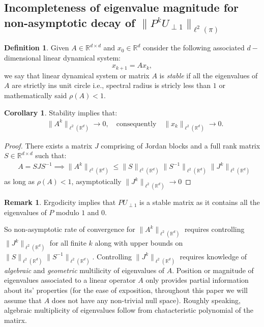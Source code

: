 \documentclass[preprint]{imsart}
\theoremstyle{plain}
\theoremstyle{definition}
\newtheorem{definition}[theorem]{Definition}
\newtheorem{remark}{Remark}
\newtheorem{corollary}{Corollary}
\begin{document}
\subsection{Incompleteness of eigenvalue magnitude for non-asymptotic decay of $\|P^{k}U_{\perp 1}\|_{\ell^{2}(\pi)}$}
\begin{definition}
Given $A \in \mathbb{R}^{d \times d}$ and $x_{0} \in \mathbb{R}^{d}$ consider the following associated $d-$ dimensional linear dynamical system:
\[
x_{k+1}=Ax_{k},
\]
we say that linear dynamical system or matrix $A$ is \emph{stable}  if all the eigenvalues of $A$ are strictly ins unit circle i.e., spectral radius is stricly less than $1$ or mathematically said $\rho(A)<1$.     
\end{definition}
\begin{corollary}
    Stability implies that:
    \begin{align}
        & \nonumber \|A^{k}\|_{\ell^{2}(\mathbb{R}^{d})}\rightarrow 0, \quad \text{consequently}  \quad   \|x_{k}\|_{\ell^{2}(\mathbb{R}^{d})} \rightarrow 0.      
    \end{align}
\end{corollary}
\begin{proof}
    There exists a matrix $J$ comprising of Jordan blocks and a full rank matrix $S \in \mathbb{R}^{d \times d}$ such that: 
     \begin{align}
         & \nonumber A=SJS^{-1} \implies \|A^{k}\|_{\ell^{2}(\mathbb{R}^{d})} \leq \|S\|_{\ell^{2}(\mathbb{R}^{d})}\|S^{-1}\|_{\ell^{2}(\mathbb{R}^{d})}\|J^{k}\|_{\ell^{2}(\mathbb{R}^{d})}          
     \end{align}
     as long as $\rho(A)<1$, asymptotically $\|J^{k}\|_{\ell^{2}(\mathbb{R}^{d})}\rightarrow 0$
\end{proof}
\begin{remark}
    Ergodicity implies that $PU_{\perp 1}$ is a stable matrix as it contains all the eigenvalues of $P$ modulo $1$ and $0$.
\end{remark}
So non-asymptotic rate of convergence for $\|A^{k}\|_{\ell^{2}(\mathbb{R}^{d})}$ requires controlling $\|J^{k}\|_{\ell^{2}(\mathbb{R}^{d})}$ for all finite $k$ along with upper bounds on $\|S\|_{\ell^{2}(\mathbb{R}^{d})}\|S^{-1}\|_{\ell^{2}(\mathbb{R}^{d})}$. Controlling $\|J^{k}\|_{\ell^{2}(\mathbb{R}^{d})}$ requires knowledge of \emph{algebraic} and \emph{geometric} multilicity of eigenvalues of $A$. Position or magnitude of eigenvalues associated to a linear operator $A$ only provides partial information about its' properties (for the ease of exposition, throughout this paper we will assume that $A$ does not have any non-trivial null space). Roughly speaking, algebraic multiplicity of eigenvalues follow from chatacteristic polynomial of the matirx. 
\end{document}
